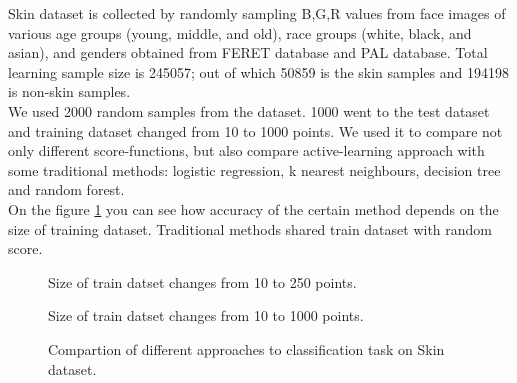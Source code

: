 \documentclass[a4paper]{article}
\begin{document}
Skin dataset  is collected by randomly sampling B,G,R values from face images of various age groups (young, middle, and old), race groups (white, black, and asian), and genders obtained from FERET database and PAL database. Total learning sample size is 245057; out of which 50859 is the skin samples and 194198 is non-skin samples. 
\\
We used 2000 random samples from the dataset. 1000 went to the test dataset and training dataset changed from 10 to 1000 points. We used it to compare not only different score-functions, but also compare active-learning approach with some traditional methods: logistic regression, k nearest neighbours, decision tree and random forest.
\\
On the figure \ref{Skinacc} you can see how accuracy of the certain method depends on the size of training dataset. Traditional methods shared train dataset with random score.

\begin{figure}[h]
\begin{minipage}[c]{0.49\linewidth}
 Size of train datset changes from 10 to 250 points.
\end{minipage}
\vfill
\begin{minipage}[c]{0.49\linewidth}
 Size of train datset changes from 10 to 1000 points.
\end{minipage}
\caption{Compartion of different approaches to classification task on Skin dataset.}
\label{Skinacc}
\end{figure}
\end{document}
